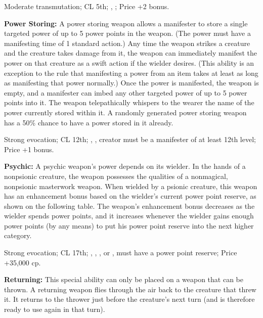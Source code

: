 Moderate transmutation; CL 5th; , ; Price +2 bonus.

\textbf{Power Storing:} A power storing weapon allows a manifester to store a single targeted power of up to 5 power points in the weapon. (The power must have a manifesting time of 1 standard action.) Any time the weapon strikes a creature and the creature takes damage from it, the weapon can immediately manifest the power on that creature as a swift action if the wielder desires. (This ability is an exception to the rule that manifesting a power from an item takes at least as long as manifesting that power normally.) Once the power is manifested, the weapon is empty, and a manifester can imbed any other targeted power of up to 5 power points into it. The weapon telepathically whispers to the wearer the name of the power currently stored within it. A randomly generated power storing weapon has a 50\% chance to have a power stored in it already.

Strong evocation; CL 12th; , , creator must be a manifester of at least 12th level; Price +1 bonus.

\textbf{Psychic:} A psychic weapon's power depends on its wielder. In the hands of a nonpsionic creature, the weapon possesses the qualities of a nonmagical, nonpsionic masterwork weapon. When wielded by a psionic creature, this weapon has an enhancement bonus based on the wielder's current power point reserve, as shown on the following table. The weapon's enhancement bonus decreases as the wielder spends power points, and it increases whenever the wielder gains enough power points (by any means) to put his power point reserve into the next higher category.


Strong evocation; CL 17th; , , ,  or , must have a power point reserve; Price +35,000 cp.

\textbf{Returning:} This special ability can only be placed on a weapon that can be thrown. A returning weapon flies through the air back to the creature that threw it. It returns to the thrower just before the creature's next turn (and is therefore ready to use again in that turn).

